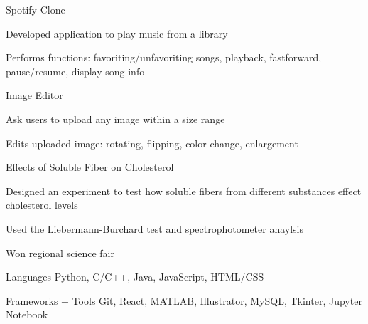 \documentclass[12pt, letterpaper]{awesome-cv}
\begin{document}
\begin{cventries}
  \cventry
    {} %
    {Spotify Clone} %
    {} %
    {} %
    {
      \vspace{-0.2in}
      \begin{cvitems} %
        \vspace{-0.5in}
        \item {Developed application to play music from a library}
        \item {Performs functions: favoriting/unfavoriting songs, playback, fastforward, pause/resume, display song info}
      \end{cvitems}
    }

  \cventry
    {} %
    {Image Editor} %
    {} %
    {} %
    {
      \vspace{-0.2in}
      \begin{cvitems} %
        \vspace{-0.1in}
        \item {Ask users to upload any image within a size range}
        \item {Edits uploaded image: rotating, flipping, color change, enlargement}
      \end{cvitems}
    }

    \cventry
    {} %
    {Effects of Soluble Fiber on Cholesterol} %
    {} %
    {} %
    {
      \vspace{-0.2in}
      \begin{cvitems} %
        \item {Designed an experiment to test how soluble fibers from different substances effect cholesterol levels}
        \item {Used the Liebermann-Burchard test and spectrophotometer anaylsis}
        \item {Won regional science fair}
      \end{cvitems}
    }
\end{cventries}

\begin{cvskills}
  \cvskill
    {Languages} %
    {Python, C/C++, Java, JavaScript, HTML/CSS} %

  \cvskill
    {Frameworks + Tools} %
    {Git, React, MATLAB, Illustrator, MySQL, Tkinter, Jupyter Notebook} %
  
    
\end{cvskills}

\end{document}
